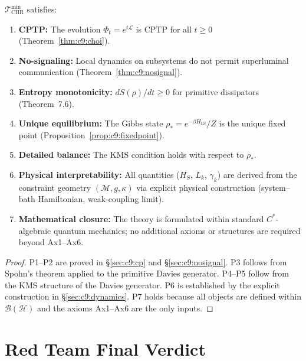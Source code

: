 \begin{theorem}
\label{thm:c9:properties}
$\mathcal{T}_{\mathrm{CIIR}}^{\min}$ satisfies:
\begin{enumerate}
\item[\textbf{P1}] \textbf{CPTP:}  The evolution $\Phi_t = e^{t\mathcal{L}}$
  is CPTP for all $t \geq 0$ (Theorem~\ref{thm:c9:choi}).
\item[\textbf{P2}] \textbf{No-signaling:}  Local dynamics on subsystems
  do not permit superluminal communication (Theorem~\ref{thm:c9:nosignal}).
\item[\textbf{P3}] \textbf{Entropy monotonicity:}  $dS(\rho)/dt \geq 0$
  for primitive dissipators (Theorem~7.6).
\item[\textbf{P4}] \textbf{Unique equilibrium:}  The Gibbs state
  $\rho_* = e^{-\beta H_{\mathrm{LS}}}/Z$ is the unique fixed point
  (Proposition~\ref{prop:c9:fixedpoint}).
\item[\textbf{P5}] \textbf{Detailed balance:}  The KMS condition holds
  with respect to $\rho_*$.
\item[\textbf{P6}] \textbf{Physical interpretability:}  All
  quantities ($H_S$, $L_k$, $\gamma_k$) are derived from the constraint
  geometry $(\mathcal{M}, g, \kappa)$ via explicit physical
  construction (system--bath Hamiltonian, weak-coupling limit).
\item[\textbf{P7}] \textbf{Mathematical closure:}  The theory is
  formulated within standard $C^*$-algebraic quantum mechanics; no
  additional axioms or structures are required beyond Ax1--Ax6.
\end{enumerate}
\end{theorem}

\begin{proof}
P1--P2 are proved in \S\ref{sec:c9:cp} and \S\ref{sec:c9:nosignal}.
P3 follows from Spohn's theorem applied to the primitive Davies generator.
P4--P5 follow from the KMS structure of the Davies generator.
P6 is established by the explicit construction in \S\ref{sec:c9:dynamics}.
P7 holds because all objects are defined within $\mathcal{B}(\mathcal{H})$
and the axioms Ax1--Ax6 are the only inputs.
\end{proof}


\section{Red Team Final Verdict}
\label{sec:c9:verdict}

